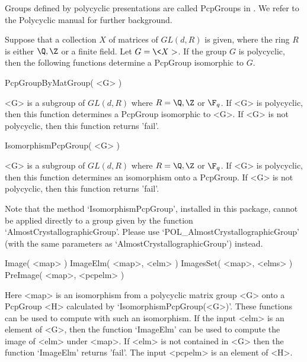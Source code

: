 
 
Groups defined by polycyclic presentations are called PcpGroups in
{\GAP}.
We refer to the Polycyclic manual \cite{Polycyclic} for further
background.

Suppose that a collection $X$ of
matrices of $GL(d,R)$ is given, where the ring $R$ 
is either $\Q,\Z$ or a finite field.  Let $G= \< X >$. 
If the group $G$ is polycyclic, then the
following functions determine a PcpGroup isomorphic to $G$.
 
\> PcpGroupByMatGroup( <G> )

<G> is  a subgroup of $GL(d,R)$ where $R=\Q,\Z $ or $\F_q$.
If <G> is polycyclic, then 
this function determines a PcpGroup isomorphic to <G>. 
If <G> is not polycyclic, then 
this function returns 'fail'. 

\> IsomorphismPcpGroup( <G> )
 
<G> is  a subgroup of $GL(d,R)$ where $R=\Q,\Z $ or $\F_q$.
If <G> is polycyclic, then 
this function determines  an isomorphism
onto a PcpGroup. 
If <G> is not polycyclic, then
this function returns 'fail'.


Note that the method `IsomorphismPcpGroup', 
installed in this package, cannot be
applied directly to a group given by the function `AlmostCrystallographicGroup'.
Please use  `POL_AlmostCrystallographicGroup' (with the same
parameters as `AlmostCrystallographicGroup') instead. 

\> Image( <map> ) 
\> ImageElm( <map>, <elm> )
\> ImagesSet( <map>, <elms> )
\> PreImage( <map>, <pcpelm> )
 
Here <map> is an isomorphism from a polycyclic matrix group <G>
onto a PcpGroup <H> calculated
by `IsomorphismPcpGroup(<G>)'.
These functions can be used to compute with such an isomorphism. 
If the input <elm>  is an element of <G>, then the function `ImageElm'
 can be used to compute the image of <elm> under <map>. 
If <elm> is not contained in <G>
then the function `ImageElm' returns 'fail'. 
The input <pcpelm> is an element
of <H>. 

